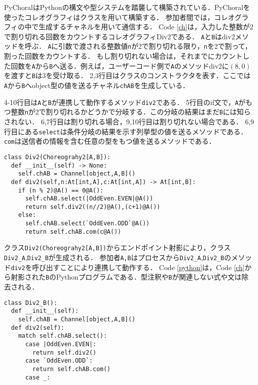 \documentclass{resume}
\begin{document}
PyChoralはPythonの構文や型システムを踏襲して構築されている．PyChoralを使ったコレオグラフィはクラスを用いて構築する．
参加者間では，コレオグラフィの中で生成するチャネルを用いて通信する．
Code \ref{ch}は，入力した整数が2で割り切れる回数をカウントするコレオグラフィ\textsf{Div2}である．
\texttt{A}と\texttt{B}は\textsf{div2}メソッドを呼ぶ．
\texttt{A}に引数で渡される整数値\texttt{n}が2で割り切れる限り，\texttt{n}を2で割って，割った回数をカウントする．
もし割り切れない場合は，それまでにカウントした回数を\texttt{A}から\texttt{B}へ送る．例えば，ユーザーコード側で\texttt{A}のメソッド\textsf{div2}に$(8,0)$を渡すと\texttt{B}は3を受け取る．
2,3行目はクラスのコンストラクタを表す．ここでは\texttt{A}から\texttt{B}へobject型の値を送るチャネル\texttt{chAB}を生成している．

4-10行目は\texttt{A}と\texttt{B}が連携して動作するメソッド\texttt{div2}である．
5行目のif文で，\texttt{A}がもつ整数\texttt{n}が2で割り切れるかどうかで分岐する．この分岐の結果はまだ\texttt{B}には知らされない．
6,7行目は割り切れる場合，9,10行目は割り切れない場合である．
6,9行目にある\texttt{select}は条件分岐の結果を示す列挙型の値を送るメソッドである．
\texttt{com}は送信者の情報を含む任意の型をもつ値を送るメソッドである．
\begin{lstlisting}[caption=PyChoralによるコレオグラフィ,label=ch]
class Div2(Choreograhy2[A,B]):
  def __init__(self) -> None:
    self.chAB = Channel[object,A,B]()
  def div2(self,n:At[int,A],c:At[int,A]) -> At[int,B]:
    if (n % 2)@A() == 0@A():
      self.chAB.select(|OddEven.EVEN|@A())
      return self.div2((n//2)@A(),(c+1)@A())
    else:
      self.chAB.select(`OddEven.ODD`@A())
      return self.chAB.com(c@A())
\end{lstlisting}
\vspace*{-7pt}

クラス\texttt{Div2(Choreograhy2[A,B])}からエンドポイント射影により，クラス\texttt{Div2\_A},\texttt{Div2\_B}が生成される．
参加者\texttt{A,B}はプロセスから\texttt{Div2\_A},\texttt{Div2\_B}のメソッド\texttt{div2}を呼び出すことにより連携して動作する．
Code \ref{python}は，Code \ref{ch}から射影された\texttt{B}のPythonプログラムである．型注釈や\texttt{B}が関連しない式や文は除去される．
\begin{lstlisting}[caption=参加者\texttt{B}のPythonプログラム,label=python]
class Div2_B():
  def __init__(self):
    self.chAB = Channel[object,A,B]()
  def div2(self):
    match self.chAB.select():
      case |OddEven.EVEN|:
        return self.div2()
      case `OddEven.ODD`:
        return self.chAB.com()
      case _:
\end{lstlisting}
\vspace*{-7pt}
\end{document}
